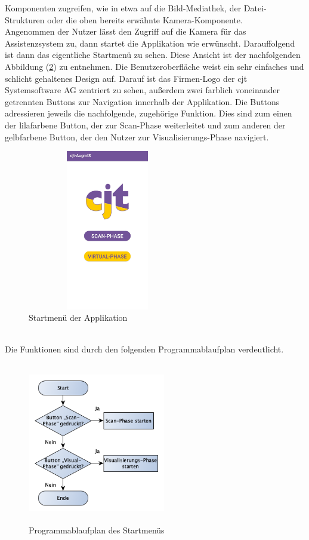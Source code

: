 Komponenten zugreifen, wie in etwa auf die Bild-Mediathek, der Datei-Strukturen oder die oben bereits erwähnte Kamera-Komponente.
\\ 
\linebreak
Angenommen der Nutzer lässt den Zugriff auf die Kamera für das Assistenzsystem zu, dann startet die Applikation wie erwünscht. Darauffolgend ist dann 
das eigentliche Startmenü zu sehen. Diese Ansicht ist der nachfolgenden Abbildung (\ref{pic:startmenu}) zu entnehmen. Die Benutzeroberfläche weist ein sehr einfaches und 
schlicht gehaltenes Design auf. 
Darauf ist das Firmen-Logo der cjt Systemsoftware AG zentriert zu sehen, außerdem zwei farblich voneinander getrennten Buttons zur Navigation innerhalb der Applikation. 
Die Buttons adressieren jeweils die nachfolgende, zugehörige Funktion. Dies sind zum einen der lilafarbene Button, der zur Scan-Phase weiterleitet und zum anderen der 
gelbfarbene Button, der den Nutzer zur Visualisierungs-Phase navigiert. %
\begin{figure}[hbt!]
    \centering
    \includegraphics[width=7cm,height=7cm,keepaspectratio]{4Umsetzung/Bilder/startmenu.jpg}
    \caption{Startmenü der Applikation}
    \label{pic:startmenu}
\end{figure}
\\
Die Funktionen sind durch den folgenden Programmablaufplan verdeutlicht. 
\begin{figure}[hbt!]
    \centering
    \includegraphics[width=6cm,height=7cm,keepaspectratio]{4Umsetzung/Bilder/startPAP.png}
    \caption{Programmablaufplan des Startmenüs}
    \label{pic:startmenu}
\end{figure}
